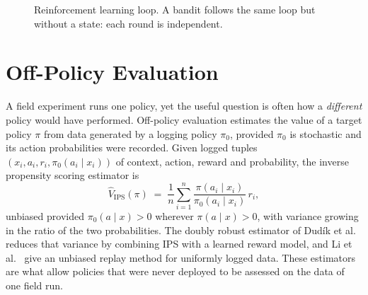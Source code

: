 \begin{figure}[htbp]
    \centering
    \caption{Reinforcement learning loop. A bandit follows the same loop but without a
    state: each round is independent.}
    \label{fig:rl_loop}
\end{figure}

\section{Off-Policy Evaluation}
\label{sec:bg_ope}

A field experiment runs one policy, yet the useful question is often how a \emph{different} policy would have performed. Off-policy evaluation estimates the value of a target policy $\pi$ from data generated by a logging policy $\pi_0$, provided $\pi_0$ is stochastic and its action probabilities were recorded. Given logged tuples $(x_i, a_i, r_i, \pi_0(a_i \mid x_i))$ of context, action, reward and probability, the inverse propensity scoring estimator is
\begin{equation}
    \hat{V}_{\mathrm{IPS}}(\pi)
    \;=\;
    \frac{1}{n} \sum_{i=1}^{n}
    \frac{\pi(a_i \mid x_i)}{\pi_0(a_i \mid x_i)} \, r_i ,
    \label{eq:ips}
\end{equation}
unbiased provided $\pi_0(a \mid x) > 0$ wherever $\pi(a \mid x) > 0$, with variance growing in the ratio of the two probabilities. The doubly robust estimator of Dud\'ik et al.~\cite{dudik2011doubly} reduces that variance by combining IPS with a learned reward model, and Li et al.~\cite{li2011unbiased} give an unbiased replay method for uniformly logged data. These estimators are what allow policies that were never deployed to be assessed on the data of one field run.

